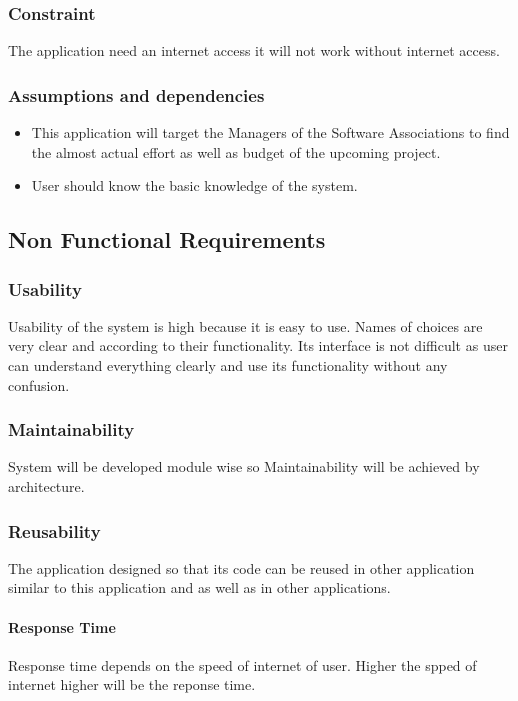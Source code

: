\subsubsection{Constraint}
The application need an internet access it will not work without internet access.
\subsubsection{Assumptions and dependencies}
\begin{center}
    \begin{itemize}
        \item This application will target the Managers of the Software Associations to find the almost actual effort as well as budget of the upcoming project.
        \item User should know the basic knowledge of the system.
    \end{itemize}
\end{center}
\subsection{Non Functional Requirements}
\subsubsection{Usability}
Usability of the system is high because it is easy to use. Names of choices are very clear and according to their functionality. Its interface is not difficult as user can understand
everything clearly and use its functionality without any confusion.  
\subsubsection{Maintainability}
System will be developed module wise so Maintainability will be achieved by architecture.
\subsubsection{Reusability}
The application designed so that its code can be reused in other application similar to this application and as well as in other applications.
\paragraph{Response Time}
Response time depends on the speed of internet of user. Higher the spped of internet higher will be the reponse time.



